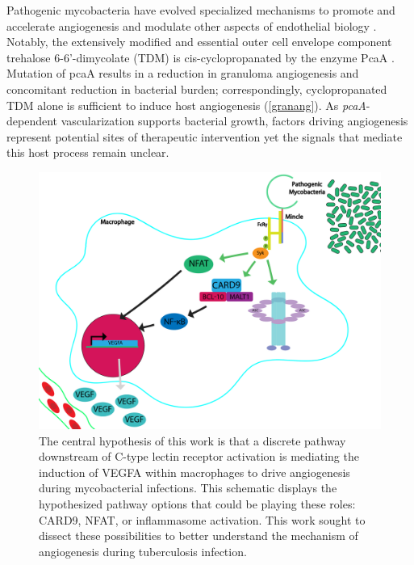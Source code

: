 Pathogenic mycobacteria have evolved specialized mechanisms to promote and accelerate angiogenesis and modulate other aspects of endothelial biology \citep{Oehlers2017}. Notably, the extensively modified and essential outer cell envelope component trehalose 6\hyp{}6'\hyp{}dimycolate (TDM) is cis\hyp{}cyclopropanated by the enzyme PcaA \citep{Glickman2000, Rao2005}. Mutation of pcaA results in a reduction in granuloma angiogenesis and concomitant reduction in bacterial burden; correspondingly, cyclopropanated TDM alone is sufficient to induce host angiogenesis \citep{Saita2000, Sakaguchi2000, Walton2018} (\autoref{granang}). As \textit{pcaA}\hyp{}dependent vascularization supports bacterial growth, factors driving angiogenesis represent potential sites of therapeutic intervention yet the signals that mediate this host process remain unclear.

\begin{figure}
\centering
\includegraphics[width=\textwidth]{images/intro_schematic.pdf}
\caption[Schematic of the possible pathways downstream of C-type lectin activation]{The central hypothesis of this work is that a discrete pathway downstream of C\hyp{}type lectin receptor activation is mediating the induction of VEGFA within macrophages to drive angiogenesis during mycobacterial infections. This schematic displays the hypothesized pathway options that could be playing these roles: CARD9, NFAT, or inflammasome activation. This work sought to dissect these possibilities to better understand the mechanism of angiogenesis during tuberculosis infection.}
\label{figure:beginschematic}
\end{figure}

